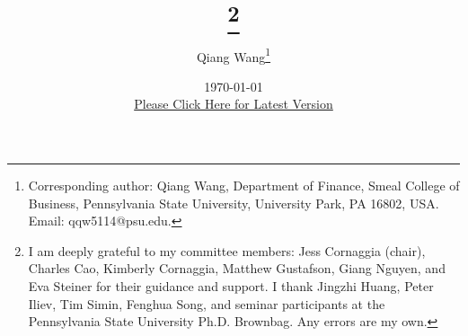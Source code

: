 \documentclass[12pt]{article}
\title{ \vspace*{0cm} \hspace*{0cm}{\LARGE  \textbf{The Effects of Margin Requirements in \\DeFi Lending Markets}}\footnote{I am deeply grateful to my committee members: Jess Cornaggia (chair), Charles Cao, Kimberly Cornaggia, Matthew Gustafson, Giang Nguyen, and Eva Steiner for their guidance and support. I thank Jingzhi Huang, Peter Iliev, Tim Simin, Fenghua Song, and seminar participants at the Pennsylvania State University Ph.D. Brownbag. Any errors are my own.}}
\author{Qiang Wang\thanks{Corresponding author: Qiang Wang, Department of Finance, Smeal College of Business, Pennsylvania State University, University Park, PA 16802, USA. Email: qqw5114@psu.edu.}}
\date{\today  \\ \bigskip 
\normalsize \href{https://www.dropbox.com/scl/fi/mrs7ib3hwukvog9ka75ww/JMP_Wang.pdf?rlkey=5yv3aa18q4wvom1icx0zu5u1s&dl=0}{Please Click Here for Latest Version}}
\begin{document}
\maketitle

\thispagestyle{empty}



\begin{abstract}


\end{abstract}
\end{document}

